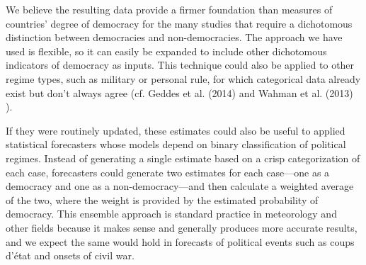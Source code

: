 \documentclass[letterpaper]{article}
\begin{document}
We believe the resulting data provide a firmer foundation than measures of countries' degree of democracy for the many studies that require a dichotomous distinction between democracies and non-democracies. The approach we have used is flexible, so it can easily be expanded to include other dichotomous indicators of democracy as inputs. This technique could also be applied to other regime types, such as military or personal rule, for which categorical data already exist but don't always agree (cf. Geddes et al. (2014) \cite{geddes} and Wahman et al. (2013) \cite{wahman}).

If they were routinely updated, these estimates could also be useful to applied statistical forecasters whose models depend on binary classification of political regimes. Instead of generating a single estimate based on a crisp categorization of each case, forecasters could generate two estimates for each case—one as a democracy and one as a non-democracy—and then calculate a weighted average of the two, where the weight is provided by the estimated probability of democracy. This ensemble approach is standard practice in meteorology and other fields because it makes sense and generally produces more accurate results, and we expect the same would hold in forecasts of political events such as coups d’état and onsets of civil war.
\end{document}
